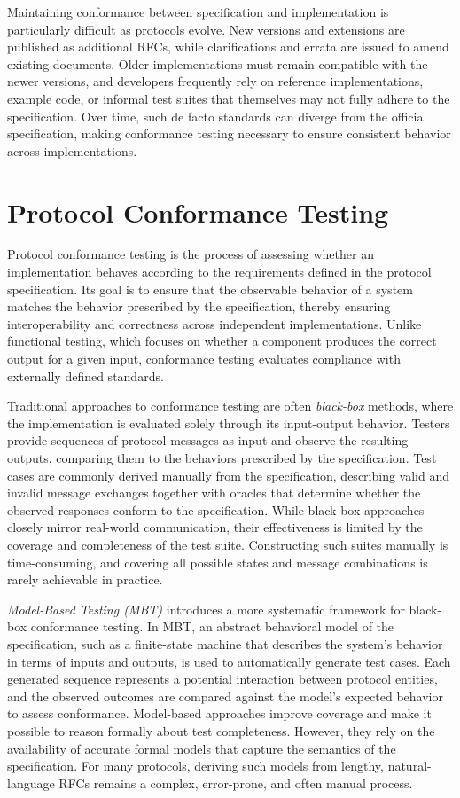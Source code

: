 Maintaining conformance between specification and implementation is particularly difficult as protocols evolve.
New versions and extensions are published as additional RFCs, while clarifications and errata are issued to amend existing documents.
Older implementations must remain compatible with the newer versions, and developers frequently rely on reference implementations, example code, or informal test suites that themselves may not fully adhere to the specification.
Over time, such de facto standards can diverge from the official specification, making conformance testing necessary to ensure consistent behavior across implementations.

\section{Protocol Conformance Testing}
Protocol conformance testing is the process of assessing whether an implementation behaves according to the requirements defined in the protocol specification.
Its goal is to ensure that the observable behavior of a system matches the behavior prescribed by the specification, thereby ensuring interoperability and correctness across independent implementations.
Unlike functional testing, which focuses on whether a component produces the correct output for a given input, conformance testing evaluates compliance with externally defined standards.

Traditional approaches to conformance testing are often \emph{black-box} methods, where the implementation is evaluated solely through its input-output behavior.
Testers provide sequences of protocol messages as input and observe the resulting outputs, comparing them to the behaviors prescribed by the specification.
Test cases are commonly derived manually from the specification, describing valid and invalid message exchanges together with oracles that determine whether the observed responses conform to the specification. 
While black-box approaches closely mirror real-world communication, their effectiveness is limited by the coverage and completeness of the test suite.
Constructing such suites manually is time-consuming, and covering all possible states and message combinations is rarely achievable in practice.

\emph{Model-Based Testing (MBT)} introduces a more systematic framework for black-box conformance testing.
In MBT, an abstract behavioral model of the specification, such as a finite-state machine that describes the system's behavior in terms of inputs and outputs, is used to automatically generate test cases.
Each generated sequence represents a potential interaction between protocol entities, and the observed outcomes are compared against the model's expected behavior to assess conformance.
Model-based approaches improve coverage and make it possible to reason formally about test completeness.
However, they rely on the availability of accurate formal models that capture the semantics of the specification.
For many protocols, deriving such models from lengthy, natural-language RFCs remains a complex, error-prone, and often manual process.

